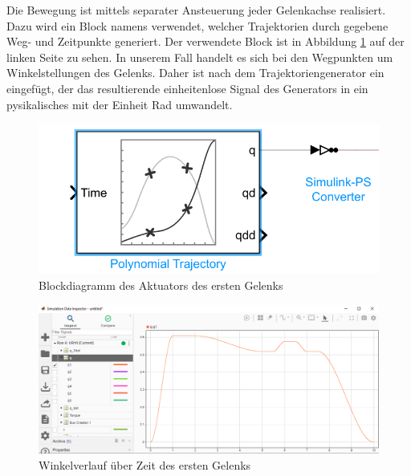 Die Bewegung ist mittels separater Ansteuerung jeder Gelenkachse realisiert.
Dazu wird ein Block namens  verwendet, welcher Trajektorien durch gegebene Weg- und Zeitpunkte generiert.
Der verwendete Block ist in Abbildung \ref{fig:ur10_trajectoriengenerator} auf der linken Seite zu sehen.
In unserem Fall handelt es sich bei den Wegpunkten um Winkelstellungen des Gelenks.
Daher ist nach dem Trajektoriengenerator ein  eingefügt, der das resultierende einheitenlose Signal des Generators in ein pysikalisches mit der Einheit Rad umwandelt.

\begin{figure}[!htbp]
	\centering
	\includegraphics[width=0.55\linewidth]{grafic/Trajectoriengenerator}
	\caption{Blockdiagramm des Aktuators des ersten Gelenks}
	\label{fig:ur10_trajectoriengenerator}
\end{figure}





\newpage
\begin{figure}[!htbp]
	\centering
	\includegraphics[width=1.0\linewidth]{grafic/data_inspector_Winkel_erstes_Gelenk}
	\caption{Winkelverlauf über Zeit des ersten Gelenks}
	\label{fig:data_inspector_rotation_angle}
\end{figure}


